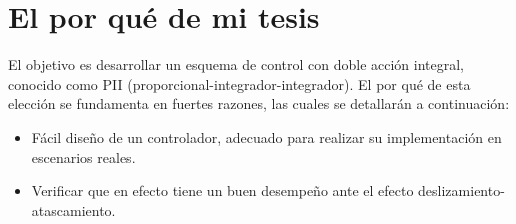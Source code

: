 \section{El por qué de mi tesis}
El objetivo es desarrollar un esquema de control con doble acción integral, conocido como PII (proporcional-integrador-integrador). El por qué de esta elección se fundamenta en fuertes razones, las cuales se detallarán a continuación:
\begin{itemize}
 \item Fácil diseño de un controlador, adecuado para realizar su implementación en escenarios reales.
 \item Verificar que en efecto tiene un buen desempeño ante el efecto deslizamiento-atascamiento.
\end{itemize}

